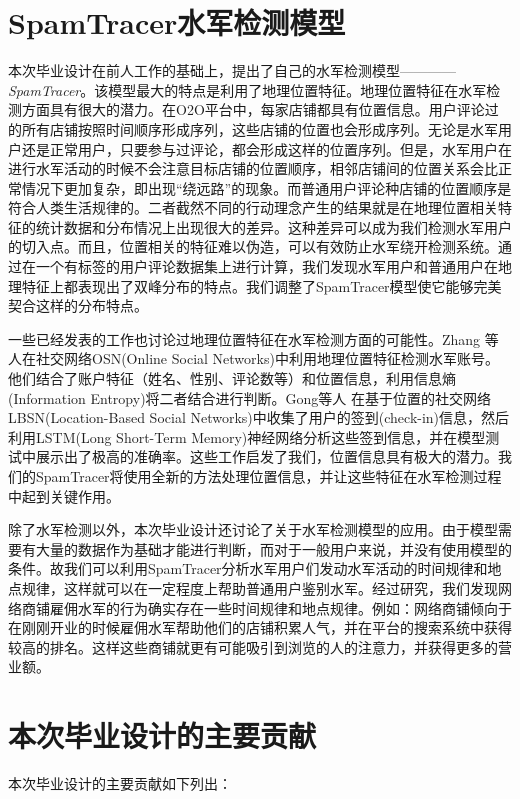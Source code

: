 \section{SpamTracer水军检测模型}

本次毕业设计在前人工作的基础上，提出了自己的水军检测模型————\emph{SpamTracer}。该模型最大的特点是利用了地理位置特征。地理位置特征在水军检测方面具有很大的潜力。在O2O平台中，每家店铺都具有位置信息。用户评论过的所有店铺按照时间顺序形成序列，这些店铺的位置也会形成序列。无论是水军用户还是正常用户，只要参与过评论，都会形成这样的位置序列。但是，水军用户在进行水军活动的时候不会注意目标店铺的位置顺序，相邻店铺间的位置关系会比正常情况下更加复杂，即出现“绕远路”的现象。而普通用户评论种店铺的位置顺序是符合人类生活规律的。二者截然不同的行动理念产生的结果就是在地理位置相关特征的统计数据和分布情况上出现很大的差异。这种差异可以成为我们检测水军用户的切入点。而且，位置相关的特征难以伪造，可以有效防止水军绕开检测系统。通过在一个有标签的用户评论数据集上进行计算，我们发现水军用户和普通用户在地理特征上都表现出了双峰分布的特点。我们调整了SpamTracer模型使它能够完美契合这样的分布特点。

一些已经发表的工作也讨论过地理位置特征在水军检测方面的可能性。Zhang \parencite{Zhang:2014}等人在社交网络OSN(Online Social Networks)中利用地理位置特征检测水军账号。他们结合了账户特征（姓名、性别、评论数等）和位置信息，利用信息熵(Information Entropy)将二者结合进行判断。Gong等人 \parencite{Gong:2018}在基于位置的社交网络LBSN(Location-Based Social Networks)中收集了用户的签到(check-in)信息，然后利用LSTM(Long Short-Term Memory)神经网络分析这些签到信息，并在模型测试中展示出了极高的准确率。这些工作启发了我们，位置信息具有极大的潜力。我们的SpamTracer将使用全新的方法处理位置信息，并让这些特征在水军检测过程中起到关键作用。

除了水军检测以外，本次毕业设计还讨论了关于水军检测模型的应用。由于模型需要有大量的数据作为基础才能进行判断，而对于一般用户来说，并没有使用模型的条件。故我们可以利用SpamTracer分析水军用户们发动水军活动的时间规律和地点规律，这样就可以在一定程度上帮助普通用户鉴别水军。经过研究，我们发现网络商铺雇佣水军的行为确实存在一些时间规律和地点规律。例如：网络商铺倾向于在刚刚开业的时候雇佣水军帮助他们的店铺积累人气，并在平台的搜索系统中获得较高的排名。这样这些商铺就更有可能吸引到浏览的人的注意力，并获得更多的营业额。


\section{本次毕业设计的主要贡献}

本次毕业设计的主要贡献如下列出：

